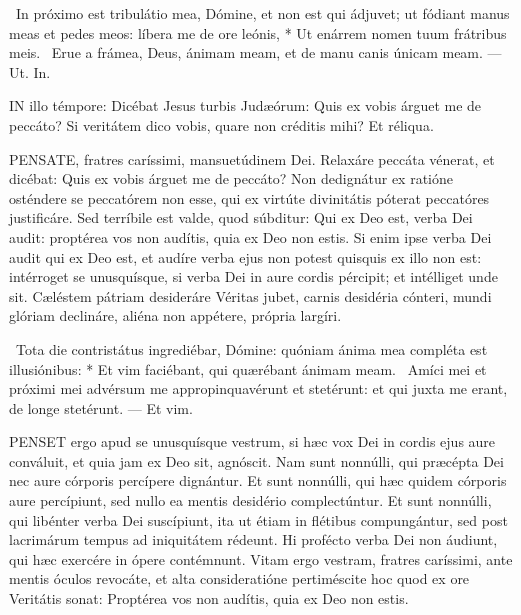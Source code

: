 \R\ In próximo est tribulátio mea, Dómine, et non est qui ádjuvet; ut fódiant manus meas et pedes meos: líbera me de ore leónis, * Ut enárrem nomen tuum frátribus meis. \V\ Erue a frámea, Deus, ánimam meam, et de manu canis únicam meam. --- Ut. In.




\lettrine[lines=2]{I}{N} illo témpore: Dicébat Jesus turbis Judæórum: Quis ex vobis árguet me de peccáto? Si veritátem dico vobis, quare non créditis mihi? Et réliqua.




\lettrine[lines=2]{P}{ENSATE}, fratres caríssimi, mansuetúdinem Dei. Relaxáre peccáta vénerat, et dicébat: Quis ex vobis árguet me de peccáto? Non dedignátur ex ratióne osténdere se peccatórem non esse, qui ex virtúte divinitátis póterat peccatóres justificáre. Sed terríbile est valde, quod súbditur: Qui ex Deo est, verba Dei audit: proptérea vos non audítis, quia ex Deo non estis. Si enim ipse verba Dei audit qui ex Deo est, et audíre verba ejus non potest quisquis ex illo non est: intérroget se unusquísque, si verba Dei in aure cordis pércipit; et intélliget unde sit. Cæléstem pátriam desideráre Véritas jubet, carnis desidéria cónteri, mundi glóriam declináre, aliéna non appétere, própria largíri.

\R\ Tota die contristátus ingrediébar, Dómine: quóniam ánima mea compléta est illusiónibus: * Et vim faciébant, qui quærébant ánimam meam. \V\ Amíci mei et próximi mei advérsum me appropinquavérunt et stetérunt: et qui juxta me erant, de longe stetérunt. --- Et vim.


\lettrine[lines=2]{P}{ENSET} ergo apud se unusquísque vestrum, si hæc vox Dei in cordis ejus aure conváluit, et quia jam ex Deo sit, agnóscit. Nam sunt nonnúlli, qui præcépta Dei nec aure córporis percípere dignántur. Et sunt nonnúlli, qui hæc quidem córporis aure percípiunt, sed nullo ea mentis desidério complectúntur. Et sunt nonnúlli, qui libénter verba Dei suscípiunt, ita ut étiam in flétibus compungántur, sed post lacrimárum tempus ad iniquitátem rédeunt. Hi profécto verba Dei non áudiunt, qui hæc exercére in ópere contémnunt. Vitam ergo vestram, fratres caríssimi, ante mentis óculos revocáte, et alta consideratióne pertiméscite hoc quod ex ore Veritátis sonat: Proptérea vos non audítis, quia ex Deo non estis.

